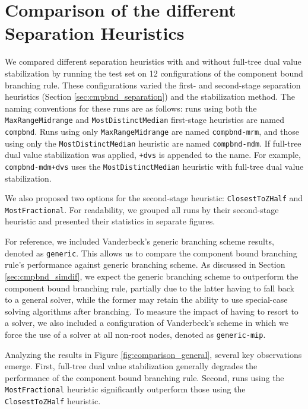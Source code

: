 \section{Comparison of the different Separation Heuristics}\label{sec:evaluation_comparison_separation}
We compared different separation heuristics with and without full-tree dual value stabilization by running the test set on 12 configurations of the component bound branching rule. These configurations varied the first- and second-stage separation heuristics (Section \ref{sec:cmpbnd_separation}) and the stabilization method. The naming conventions for these runs are as follows: runs using both the \texttt{MaxRangeMidrange} and \texttt{MostDistinctMedian} first-stage heuristics are named \texttt{compbnd}. Runs using only \texttt{MaxRangeMidrange} are named \texttt{compbnd-mrm}, and those using only the \texttt{MostDistinctMedian} heuristic are named \texttt{compbnd-mdm}. If full-tree dual value stabilization was applied, \texttt{+dvs} is appended to the name. For example, \texttt{compbnd-mdm+dvs} uses the \texttt{MostDistinctMedian} heuristic with full-tree dual value stabilization.

We also proposed two options for the second-stage heuristic: \texttt{ClosestToZHalf} and \texttt{MostFractional}. For readability, we grouped all runs by their second-stage heuristic and presented their statistics in separate figures.

For reference, we included Vanderbeck's generic branching scheme results, denoted as \texttt{generic}. This allows us to compare the component bound branching rule's performance against generic branching scheme. As discussed in Section \ref{sec:cmpbnd_simdif}, we expect the generic branching scheme to outperform the component bound branching rule, partially due to the latter having to fall back to a general \MIP{} solver, while the former may retain the ability to use special-case solving algorithms after branching. To measure the impact of having to resort to a \MIP{} solver, we also included a configuration of Vanderbeck's scheme in which we force the use of a \MIP{} solver at all non-root nodes, denoted as \texttt{generic-mip}.

Analyzing the results in Figure \ref{fig:comparison_general}, several key observations emerge. First, full-tree dual value stabilization generally degrades the performance of the component bound branching rule. Second, runs using the \texttt{MostFractional} heuristic significantly outperform those using the \texttt{ClosestToZHalf} heuristic.

